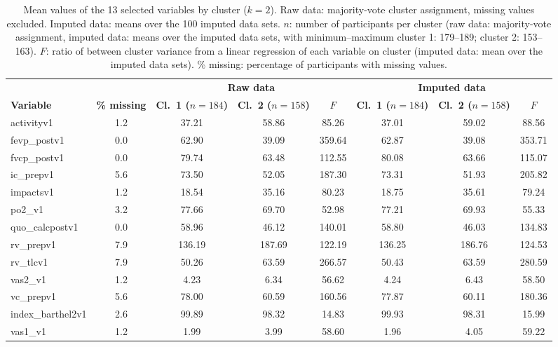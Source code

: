 \documentclass[a4paper,10pt]{article}\usepackage[]{graphicx}\usepackage[]{xcolor}
\begin{document}
\begin{table}[H]
\centering
\begingroup\scriptsize
\begin{tabular}{lccccccc}
  \toprule
  & & \multicolumn{3}{c}{\bf Raw data} & \multicolumn{3}{c}{\bf Imputed data} \\
\cmidrule(lr){3-5} \cmidrule(lr){6-8}
\bf\scriptsize Variable & \bf\scriptsize \% missing & \bf\scriptsize \shortstack{Cl.~1 \\ ($n=184$)} & \bf\scriptsize \shortstack{Cl.~2 \\ ($n=158$)} & \bf\scriptsize $F$ & \bf\scriptsize \shortstack{Cl.~1 \\ ($n=184$)} & \bf\scriptsize \shortstack{Cl.~2 \\ ($n=158$)} & \bf\scriptsize $F$ \\
 \midrule
activityv1 & 1.2 & 37.21 & 58.86 & 85.26 & 37.01 & 59.02 & 88.56 \\ 
  fevp\_postv1 & 0.0 & 62.90 & 39.09 & 359.64 & 62.87 & 39.08 & 353.71 \\ 
  fvcp\_postv1 & 0.0 & 79.74 & 63.48 & 112.55 & 80.08 & 63.66 & 115.07 \\ 
  ic\_prepv1 & 5.6 & 73.50 & 52.05 & 187.30 & 73.31 & 51.93 & 205.82 \\ 
  impactsv1 & 1.2 & 18.54 & 35.16 & 80.23 & 18.75 & 35.61 & 79.24 \\ 
  po2\_v1 & 3.2 & 77.66 & 69.70 & 52.98 & 77.21 & 69.93 & 55.33 \\ 
  quo\_calcpostv1 & 0.0 & 58.96 & 46.12 & 140.01 & 58.80 & 46.03 & 134.83 \\ 
  rv\_prepv1 & 7.9 & 136.19 & 187.69 & 122.19 & 136.25 & 186.76 & 124.53 \\ 
  rv\_tlcv1 & 7.9 & 50.26 & 63.59 & 266.57 & 50.43 & 63.59 & 280.59 \\ 
  vas2\_v1 & 1.2 & 4.23 & 6.34 & 56.62 & 4.24 & 6.43 & 58.50 \\ 
  vc\_prepv1 & 5.6 & 78.00 & 60.59 & 160.56 & 77.87 & 60.11 & 180.36 \\ 
  index\_barthel2v1 & 2.6 & 99.89 & 98.32 & 14.83 & 99.93 & 98.31 & 15.99 \\ 
  vas1\_v1 & 1.2 & 1.99 & 3.99 & 58.60 & 1.96 & 4.05 & 59.22 \\ 
   \bottomrule
\end{tabular}
\endgroup
\caption{Mean values of the 13 selected variables by cluster ($k=2$). Raw data: majority-vote cluster assignment, missing values excluded. Imputed data: means over the 100 imputed data sets. $n$: number of participants per cluster (raw data: majority-vote assignment, imputed data: means over the imputed data sets, with minimum--maximum cluster 1: 179--189; cluster 2: 153--163). $F$: ratio of between cluster variance from a linear regression of each variable on cluster (imputed data: mean over the imputed data sets). \% missing: percentage of participants with missing values.} 
\label{tab:desc}
\end{table}
\end{document}
